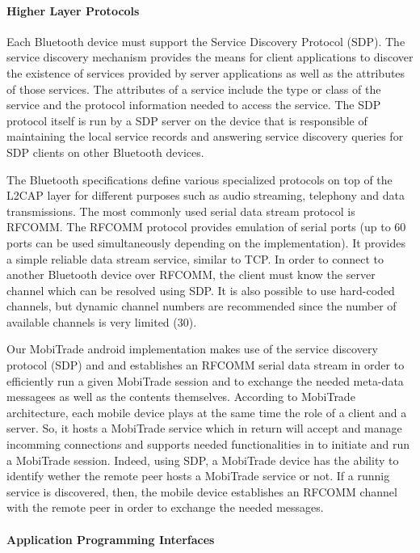 \paragraph*{Higher Layer Protocols}

Each Bluetooth device must support the Service Discovery Protocol (SDP). The service discovery mechanism provides the means for client applications to discover the existence of services provided by server applications as well as the attributes of those services. The attributes of a service include the type or class of the service and the protocol information needed to access the service. The SDP protocol itself is run by a SDP server on the device that is responsible of maintaining the local service records and answering service discovery queries for SDP clients on other Bluetooth devices.

The Bluetooth specifications define various specialized protocols on top of the L2CAP layer for different purposes such as audio streaming, telephony and data transmissions. The most commonly used serial data stream protocol is RFCOMM. The RFCOMM protocol provides emulation of serial ports (up to 60 ports can be used simultaneously depending on the implementation). It provides a simple reliable data stream service, similar to TCP. In order to connect to another Bluetooth device over RFCOMM, the client must know the server channel which can be resolved using SDP. It is also possible to use hard-coded channels, but dynamic channel numbers are recommended since the number of available channels is very limited (30). 

Our MobiTrade android implementation makes use of the service discovery protocol (SDP) and and establishes an RFCOMM serial data stream in order to efficiently run a given MobiTrade session and to exchange the needed meta-data messagees as well as the contents themselves. According to MobiTrade architecture, each mobile device plays at the same time the role of a client and a server. So, it hosts a MobiTrade service which in return will accept and manage incomming connections and supports needed functionalities in to initiate and run a MobiTrade session. Indeed,  using SDP, a MobiTrade device has the ability to identify wether the remote peer hosts a MobiTrade service or not. If a runnig service is discovered, then, the mobile device establishes an RFCOMM channel with the remote peer in order to exchange the needed messages.    

\paragraph*{Application Programming Interfaces}

